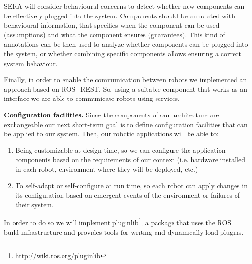 SERA will consider behavioural concerns to detect whether new components can be effectively plugged into the system. 
Components should be annotated with behavioural information, that specifies when the component can be used (assumptions) and what the component ensures (guarantees). 
This kind of annotations can be then used to analyze whether components can be plugged into the system, or whether combining specific components allows ensuring a correct system behaviour. 

Finally, in order to enable the communication between robots we implemented an approach based on ROS+REST.
So, using a suitable component that works as an interface we are able to communicate robots using services.

\textbf{Configuration facilities.}
Since the components of our architecture are exchangeable our next short-term goal is to define configuration facilities that can be applied to our system. %
Then, our robotic applications will be able to:

\begin{enumerate}
\item Being customizable at design-time, so we can configure the application components based on the requirements of our context (i.e. hardware installed in each robot, environment where they will be deployed, etc.)
\item To self-adapt or self-configure at run time, so each robot can apply changes in its configuration based on emergent events of the environment or failures of their system.
\end{enumerate}

In order to do so we will implement pluginlib\footnote{http://wiki.ros.org/pluginlib}, a package that uses the ROS build infrastructure and provides tools for writing and dynamically load plugins.




